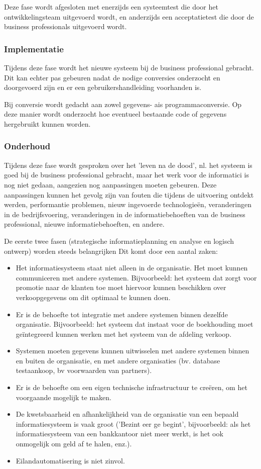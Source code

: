 Deze fase wordt afgesloten met enerzijds een systeemtest die door het ontwikkelingsteam uitgevoerd wordt, en anderzijds een acceptatietest die door de business professionals uitgevoerd wordt.
\newpage
\subsubsection{Implementatie}

Tijdens deze fase wordt het nieuwe systeem bij de business professional gebracht. Dit kan echter pas gebeuren nadat de nodige conversies onderzocht en doorgevoerd zijn en er een gebruikershandleiding voorhanden is.

Bij conversie wordt gedacht aan zowel gegevens- ais programmaconversie. Op deze manier wordt onderzocht hoe eventueel bestaande code of gegevens hergebruikt kunnen worden.

\subsubsection{Onderhoud}

Tijdens deze fase wordt gesproken over het 'leven na de dood’, nl. het systeem is goed bij de business professional gebracht, maar het werk voor de informatici is nog niet gedaan, aangezien nog aanpassingen moeten gebeuren. Deze aanpassingen kunnen het gevolg zijn van fouten die tijdens de uitvoering ontdekt werden, performantie problemen, nieuw ingevoerde technologieën, veranderingen in de bedrijfsvoering, veranderingen in de informatiebehoeften van de business professional, nieuwe informatiebehoeften, en andere.


De eerste twee fasen (strategische informatieplanning en analyse en logisch ontwerp) worden steeds belangrijken Dit komt door een aantal zaken:

\begin{itemize}
    \item Het informatiesysteem staat niet alleen in de organisatie. Het moet kunnen communiceren met andere systemen. Bijvoorbeeld: het systeem dat zorgt voor promotie naar de klanten toe moet hiervoor kunnen beschikken over verkoopgegevens om dit optimaal te kunnen doen.
    \item Er is de behoefte tot integratie met andere systemen binnen dezelfde organisatie. Bijvoorbeeld: het systeem dat instaat voor de boekhouding moet geïntegreerd kunnen werken met het systeem van de afdeling verkoop.
    \item Systemen moeten gegevens kunnen uitwisselen met andere systemen binnen en buiten de organisatie, en met andere organisaties (bv. database testaankoop, bv voorwaarden van partners).
    \item Er is de behoefte om een eigen technische infrastructuur te creëren, om het voorgaande mogelijk te maken.
    \item De kwetsbaarheid en afhankelijkheid van de organisatie van een bepaald informatiesysteem is vaak groot ('Bezint eer ge begint', bijvoorbeeld: als het informatiesysteem van een bankkantoor niet meer werkt, is het ook onmogelijk om geld af te halen, enz.).
    \item Eilandautomatisering is niet zinvol.
\end{itemize}

